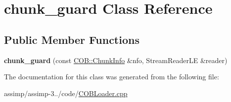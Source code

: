 \hypertarget{classchunk__guard}{\section{chunk\+\_\+guard Class Reference}
\label{classchunk__guard}
}
\subsection*{Public Member Functions}
\begin{DoxyCompactItemize}
\item 
\hypertarget{classchunk__guard_a9931cf658deee6d0cc93dbd2f970f209}{{\bfseries chunk\+\_\+guard} (const \hyperlink{struct_assimp_1_1_c_o_b_1_1_chunk_info}{C\+O\+B\+::\+Chunk\+Info} \&nfo, Stream\+Reader\+L\+E \&reader)}\label{classchunk__guard_a9931cf658deee6d0cc93dbd2f970f209}

\end{DoxyCompactItemize}


The documentation for this class was generated from the following file\+:\begin{DoxyCompactItemize}
\item 
assimp/assimp-\/3../code/\hyperlink{_c_o_b_loader_8cpp}{C\+O\+B\+Loader.\+cpp}\end{DoxyCompactItemize}
